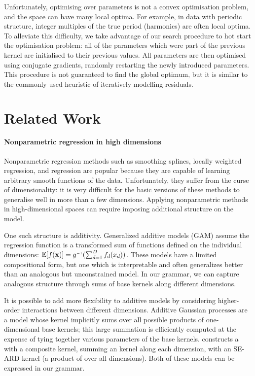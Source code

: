 Unfortunately, optimising over parameters is not a convex optimisation problem, and the space can have many local optima.
For example, in data with periodic structure, integer multiples of the true period (\ie harmonics) are often local optima. 
To alleviate this difficulty, we take advantage of our search procedure to hot start the optimisation problem: all of the parameters which were part of the previous kernel are initialised to their previous values.
All parameters are then optimised using conjugate gradients, randomly restarting the newly introduced parameters.
This procedure is not guaranteed to find the global optimum, but it is similar to the commonly used heuristic of iteratively modelling residuals.

\section{Related Work}
\label{sec:related_work}

\paragraph{Nonparametric regression in high dimensions}
Nonparametric regression methods such as smoothing splines, locally weighted regression, and \gp{} regression are popular because they are capable of learning arbitrary smooth functions of the data.
Unfortunately, they suffer from the curse of dimensionality: it is very difficult for the basic versions of these methods to generalise well in more than a few dimensions.
Applying nonparametric methods in high-dimensional spaces can require imposing additional structure on the model.

One such structure is additivity.
Generalized additive models (GAM) assume the regression function is a transformed sum of functions defined on the individual dimensions: $\expect[f(\vx)] = g\inv(\sum_{d=1}^D f_d(x_d))$.
These models have a limited compositional form, but one which is interpretable and often generalizes better than an analogous but unconstrained model.
In our grammar, we can capture analogous structure through sums of base kernels along different dimensions.

It is possible to add more flexibility to additive models by considering higher-order interactions between different dimensions. 
Additive Gaussian processes \citep{Duvenaud2011-wb} are a \gp{} model whose kernel implicitly sums over all possible products of one-dimensional base kernels; this large summation is efficiently computed at the expense of tying together various parameters of the base kernels.  
\citet{Plate1999-xh} constructs a \gp{} with a composite kernel, summing an \kSE{} kernel along each dimension, with an SE-ARD kernel (\ie a product of \kSE{} over all dimensions).
Both of these models can be expressed in our grammar.


